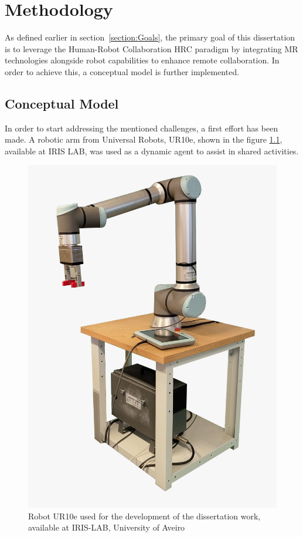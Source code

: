 \chapter{Methodology}%
\label{chapter:methodology}

As defined earlier in section~\ref{section:Goals}, the primary goal of this dissertation is to leverage the Human-Robot Collaboration \ac{HRC} paradigm by integrating \ac{MR} technologies alongside robot capabilities to enhance remote collaboration. In order to achieve this, a conceptual model is further implemented.

\section{Conceptual Model}
In order to start addressing the mentioned challenges, a first effort has been made. A robotic arm from Universal Robots, UR10e, shown in the figure \ref{f:ur10e_iris}, available at IRIS LAB, was used as a dynamic agent to assist in shared activities.

\begin{figure}[h]
    \centering
    \includegraphics[width=0.4\linewidth]{figs/ur10e.jpeg}
    \caption{Robot UR10e used for the development of the dissertation work, available at IRIS-LAB, University of Aveiro}
    \label{f:ur10e_iris}
\end{figure}

